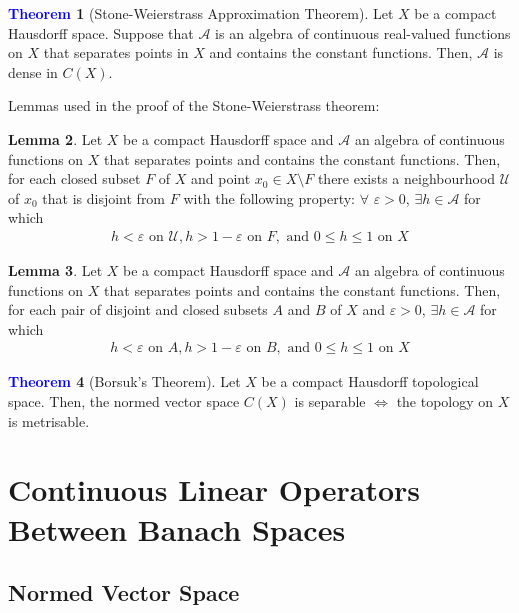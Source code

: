 \documentclass[11pt]{article}
\newcommand{\hood}[0]{\mathcal{U}}
\theoremstyle{definition}
\theoremstyle{definition}
\newtheorem{theorem}{\textcolor{blue}{Theorem}}
\newtheorem{lemma}[theorem]{Lemma}
\theoremstyle{definition}
\theoremstyle{remark}
\begin{document}
\begin{theorem}[Stone-Weierstrass Approximation Theorem]
	Let $X$ be a compact Hausdorff space. Suppose that $\mathcal{A}$ is an algebra of continuous real-valued functions on $X$ that separates points in $X$ and contains the constant functions. Then, $\mathcal{A}$ is dense in $C(X)$. 
\end{theorem}
Lemmas used in the proof of the Stone-Weierstrass theorem: 
\begin{lemma}
	Let $X$ be a compact Hausdorff space and $\mathcal{A}$ an algebra of continuous functions on $X$ that separates points and contains the constant functions. Then, for each closed subset $F$ of $X$ and point $x_0 \in X \setminus F$ there exists a neighbourhood $\hood$ of $x_0$ that is disjoint from $F$ with the following property: $\forall$ $\varepsilon >0$, $\exists h \in \mathcal{A}$ for which
	\begin{align}
		h < \varepsilon \text{ on } \hood, h > 1 - \varepsilon \text{ on } F, \text{ and } 0 \leq h \leq 1 \text{ on } X 	
	\end{align}
\end{lemma}

\begin{lemma}
	Let $X$ be a compact Hausdorff space and $\mathcal{A}$ an algebra of continuous functions on $X$ that separates points and contains the constant functions. Then, for each pair of disjoint and closed subsets $A$ and $B$ of $X$ and $\varepsilon > 0$, $\exists h \in \mathcal{A}$ for which 
	\begin{align}
		h < \varepsilon \text{ on } A, h > 1 - \varepsilon \text{ on } B, \text{ and } 0 \leq h \leq 1 \text{ on } X 	
	\end{align}
\end{lemma}

\begin{theorem}[Borsuk's Theorem]
	Let $X$ be a compact Hausdorff topological space. Then, the normed vector space $C(X)$ is separable $\iff$ the topology on $X$ is metrisable. 
\end{theorem}

\section{Continuous Linear Operators Between Banach Spaces}

\subsection{Normed Vector Space}
\end{document}
